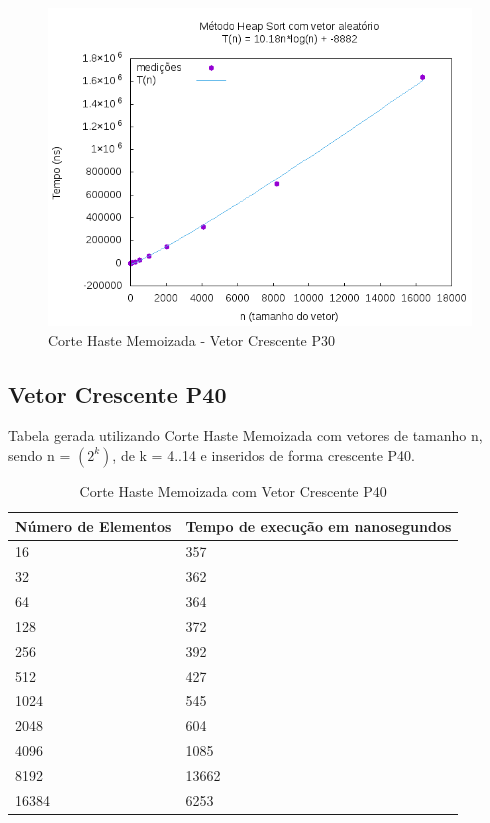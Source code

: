 \documentclass[12pt,a4paper,twoside]{report}
\begin{document}
\begin{figure}[H]
    \centering
    \includegraphics[width=0.7\linewidth]{graficos/HeapSort/vIntAleatorio/vIntAleatorio.png}
  \caption{Corte Haste Memoizada - Vetor Crescente P30}
\end{figure}





\subsection{Vetor Crescente P40}
Tabela gerada utilizando Corte Haste Memoizada com vetores de tamanho n, sendo n = $(2^k)$, de k = 4..14 e inseridos de forma crescente P40.
\begin{table}[H]
\centering
\caption{Corte Haste Memoizada com Vetor Crescente P40}
\label{my-label}
\begin{tabular}{|l|l|}
\hline
\multicolumn{1}{|c|}{\textbf{Número de Elementos}} & \multicolumn{1}{c|}{\textbf{Tempo de execução em nanosegundos}} \\ \hline
16 & 357 \\ \hline
32 & 362 \\ \hline
64 & 364 \\ \hline
128 & 372 \\ \hline
256 & 392 \\ \hline
512 & 427 \\ \hline
1024 & 545 \\ \hline
2048 & 604 \\ \hline
4096 & 1085 \\ \hline
8192 & 13662 \\ \hline
16384 & 6253 \\ \hline
\end{tabular}
\end{table}
\end{document}
